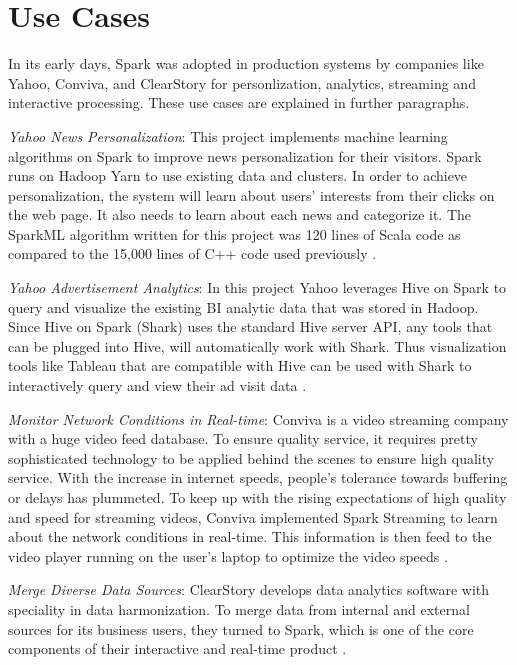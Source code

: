 \documentclass[9pt,twocolumn,twoside]{../../styles/osajnl}
\begin{document}
\section{Use Cases}

In its early days, Spark was adopted in production systems by
companies like Yahoo, Conviva, and ClearStory for personlization,
analytics, streaming and interactive processing. These use cases are
explained in further paragraphs.

\textit{Yahoo News Personalization}: This project implements machine
learning algorithms on Spark to improve news personalization for their
visitors. Spark runs on Hadoop Yarn to use existing data and
clusters. In order to achieve personalization, the system will learn
about users’ interests from their clicks on the web page. It also
needs to learn about each news and categorize it. The SparkML
algorithm written for this project was 120 lines of Scala code as
compared to the 15,000 lines of C++ code used previously
\cite{www-spark-datanami}.

\textit{Yahoo Advertisement Analytics}: In this project Yahoo
leverages Hive on Spark to query and visualize the existing BI
analytic data that was stored in Hadoop. Since Hive on Spark (Shark)
uses the standard Hive server API, any tools that can be plugged into
Hive, will automatically work with Shark. Thus visualization tools
like Tableau that are compatible with Hive can be used with Shark to
interactively query and view their ad visit data
\cite{www-spark-datanami}.

\textit{Monitor Network Conditions in Real-time}: Conviva is a video
streaming company with a huge video feed database. To ensure quality
service, it requires pretty sophisticated technology to be applied
behind the scenes to ensure high quality service. With the increase in
internet speeds, people's tolerance towards buffering or delays has
plummeted. To keep up with the rising expectations of high quality and
speed for streaming videos, Conviva implemented Spark Streaming to
learn about the network conditions in real-time. This information is
then feed to the video player running on the user's laptop to optimize
the video speeds \cite{www-spark-datanami}.

\textit{Merge Diverse Data Sources}: ClearStory develops data
analytics software with speciality in data harmonization. To merge
data from internal and external sources for its business users, they
turned to Spark, which is one of the core components of their
interactive and real-time product \cite{www-spark-datanami}.
\end{document}
